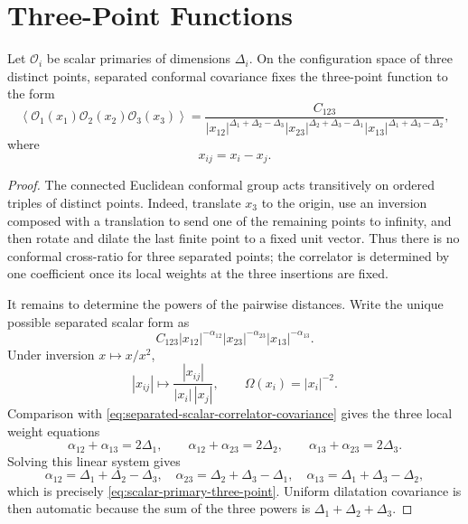 \section{Three-Point Functions}

\begin{lemma}
\label{lem:scalar-three-point-kinematics}
Let \(\mathcal O_i\) be scalar primaries of dimensions \(\Delta_i\).  On the
configuration space of three distinct points, separated conformal covariance
fixes the three-point function to the form
\begin{equation}
  \left\langle
    \mathcal O_1(x_1)\mathcal O_2(x_2)\mathcal O_3(x_3)
  \right\rangle
  =
  \frac{C_{123}}
  {|x_{12}|^{\Delta_1+\Delta_2-\Delta_3}
   |x_{23}|^{\Delta_2+\Delta_3-\Delta_1}
   |x_{13}|^{\Delta_1+\Delta_3-\Delta_2}},
  \label{eq:scalar-primary-three-point}
\end{equation}
where
\[
  x_{ij}=x_i-x_j.
\]
\end{lemma}

\begin{proof}
The connected Euclidean conformal group acts transitively on ordered triples
of distinct points.  Indeed, translate \(x_3\) to the origin, use an inversion
composed with a translation to send one of the remaining points to infinity,
and then rotate and dilate the last finite point to a fixed unit vector.  Thus
there is no conformal cross-ratio for three separated points; the correlator
is determined by one coefficient once its local weights at the three
insertions are fixed.

It remains to determine the powers of the pairwise distances.  Write the
unique possible separated scalar form as
\[
  C_{123}
  |x_{12}|^{-\alpha_{12}}
  |x_{23}|^{-\alpha_{23}}
  |x_{13}|^{-\alpha_{13}} .
\]
Under inversion \(x\mapsto x/x^2\),
\[
  |x_{ij}|
  \longmapsto
  \frac{|x_{ij}|}{|x_i|\,|x_j|},
  \qquad
  \Omega(x_i)=|x_i|^{-2}.
\]
Comparison with
\eqref{eq:separated-scalar-correlator-covariance} gives the three local
weight equations
\[
  \alpha_{12}+\alpha_{13}=2\Delta_1,\qquad
  \alpha_{12}+\alpha_{23}=2\Delta_2,\qquad
  \alpha_{13}+\alpha_{23}=2\Delta_3 .
\]
Solving this linear system gives
\[
  \alpha_{12}=\Delta_1+\Delta_2-\Delta_3,\quad
  \alpha_{23}=\Delta_2+\Delta_3-\Delta_1,\quad
  \alpha_{13}=\Delta_1+\Delta_3-\Delta_2,
\]
which is precisely \eqref{eq:scalar-primary-three-point}.  Uniform dilatation
covariance is then automatic because the sum of the three powers is
\(\Delta_1+\Delta_2+\Delta_3\).
\end{proof}


